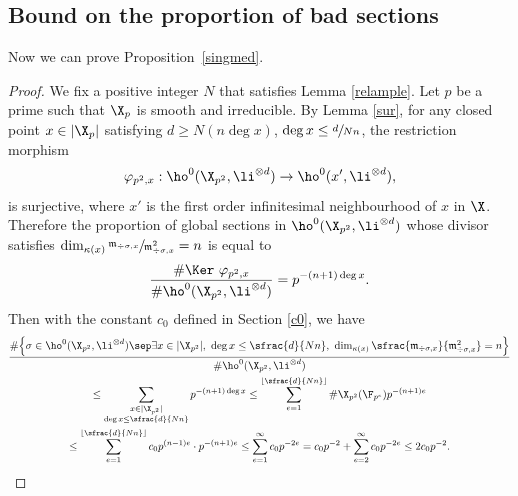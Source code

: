 \subsection{Bound on the proportion of bad sections}
Now we can prove Proposition~\ref{singmed}.

\begin{proof}
We fix a positive integer $N$ that satisfies Lemma \ref{relample}. Let $p$ be a prime such that $\X_p$ is smooth and irreducible. By Lemma \ref{sur}, for any closed point $x\in |\X_{p}|$ satisfying $d\geq N(n\deg x)$, \ie $\deg x\leq \sfrac{d}{Nn}$, the restriction morphism
\[
\varphi_{p^2,x}: \ho^0(\X_{p^2}, \li^{\otimes d})\to \ho^0(x', \li^{\otimes d}),
\]
is surjective, where $x'$ is the first order infinitesimal neighbourhood of $x$ in $\X$. Therefore the proportion of global sections in $\ho^0(\X_{p^2}, \li^{\otimes d})$ whose divisor satisfies $\dim_{\kappa(x)}\sfrac{\mathfrak{m}_{\div \sigma,x}}{\mathfrak{m}_{\div \sigma,x}^2}=n$ is equal to
\[
\frac{\#\Ker\ \varphi_{p^2,x}}{\#\ho^0(\X_{p^2}, \li^{\otimes d})}=p^{-(n+1)\deg x}.
\]
Then with the constant $c_0$ defined in Section \ref{c0}, we have
\begin{multline*}
\frac{\#\Bigl\{ \sigma\in \ho^0(\X_{p^2}, \li^{\otimes d})\sep \exists x\in |\X_{p^2}|,\ \deg x\leq \sfrac{d}{Nn},\ \dim_{\kappa(x)}\sfrac{\mathfrak{m}_{\div \sigma,x}}{\mathfrak{m}_{\div \sigma,x}^2}=n \Bigr\} }{\#\ho^0(\X_{p^2}, \li^{\otimes d})}\\
\leq \sum_{\substack{x\in |\X_{p^2}|\\ \deg x\leq \sfrac{d}{Nn}}}p^{-(n+1)\deg x}\leq \sum_{e=1}^{\lfloor \sfrac{d}{Nn} \rfloor}\#\X_{p^2}(\F_{p^e}) p^{-(n+1)e} \\
\leq \sum_{e=1}^{\lfloor \sfrac{d}{Nn} \rfloor} c_0p^{(n-1)e}\cdot p^{-(n+1)e}
\leq \sum_{e=1}^{\infty} c_0 p^{-2e}= c_0p^{-2}+\sum_{e=2}^{\infty} c_0 p^{-2e}\leq 2c_0p^{-2}.
\end{multline*}


\end{proof}
